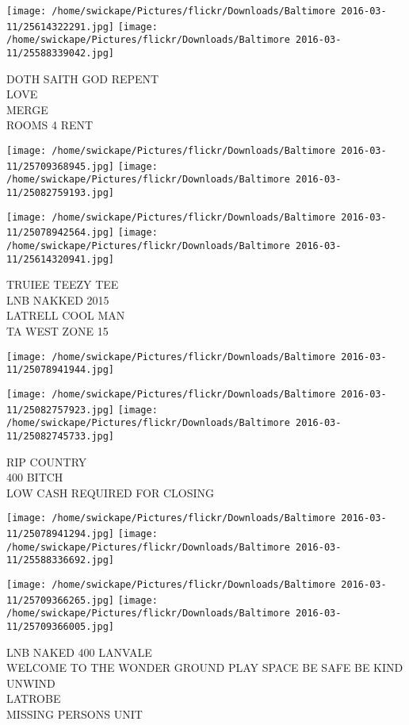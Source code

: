 \documentclass[10pt,letterpaper]{article}
\begin{document}
\texttt{[image: /home/swickape/Pictures/flickr/Downloads/Baltimore 2016-03-11/25614322291.jpg]}
\texttt{[image: /home/swickape/Pictures/flickr/Downloads/Baltimore 2016-03-11/25588339042.jpg]}

DOTH SAITH GOD REPENT\\
LOVE\\
MERGE\\
ROOMS 4 RENT\\
\pagebreak

\texttt{[image: /home/swickape/Pictures/flickr/Downloads/Baltimore 2016-03-11/25709368945.jpg]}
\texttt{[image: /home/swickape/Pictures/flickr/Downloads/Baltimore 2016-03-11/25082759193.jpg]}

\texttt{[image: /home/swickape/Pictures/flickr/Downloads/Baltimore 2016-03-11/25078942564.jpg]}
\texttt{[image: /home/swickape/Pictures/flickr/Downloads/Baltimore 2016-03-11/25614320941.jpg]}

TRUIEE TEEZY TEE\\
LNB NAKKED 2015\\
LATRELL COOL MAN\\
TA WEST ZONE 15\\
\pagebreak

\texttt{[image: /home/swickape/Pictures/flickr/Downloads/Baltimore 2016-03-11/25078941944.jpg]}

\vspace{0.25in}
\texttt{[image: /home/swickape/Pictures/flickr/Downloads/Baltimore 2016-03-11/25082757923.jpg]}
\texttt{[image: /home/swickape/Pictures/flickr/Downloads/Baltimore 2016-03-11/25082745733.jpg]}

RIP COUNTRY\\
400 BITCH\\
LOW CASH REQUIRED FOR CLOSING\\
\pagebreak

\texttt{[image: /home/swickape/Pictures/flickr/Downloads/Baltimore 2016-03-11/25078941294.jpg]}
\texttt{[image: /home/swickape/Pictures/flickr/Downloads/Baltimore 2016-03-11/25588336692.jpg]}

\texttt{[image: /home/swickape/Pictures/flickr/Downloads/Baltimore 2016-03-11/25709366265.jpg]}
\texttt{[image: /home/swickape/Pictures/flickr/Downloads/Baltimore 2016-03-11/25709366005.jpg]}

LNB NAKED 400 LANVALE\\
WELCOME TO THE WONDER GROUND PLAY SPACE BE SAFE BE KIND UNWIND\\
LATROBE\\
MISSING PERSONS UNIT\\
\pagebreak
\end{document}
